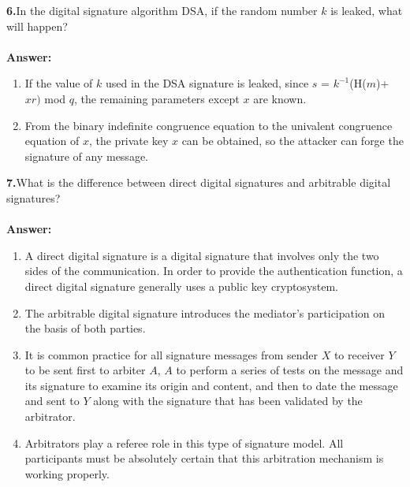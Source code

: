 \documentclass[paper=a4, fontsize=11pt]{scrartcl} %
\numberwithin{equation}{section} %
\numberwithin{figure}{section} %
\numberwithin{table}{section} %
\begin{document}
\textbf{6.}In the digital signature algorithm DSA, if the random number $k$ is leaked, what will happen?
\\
\\
\textbf{Answer:}
\begin{enumerate}
\item If the value of $k$ used in the DSA signature is leaked, since $s$ = $k^{-1}$(H($m$)+$xr)$ mod $q$, the remaining parameters except $x$ are known.
\item From the binary indefinite congruence equation to the univalent congruence equation of $x$, the private key $x$ can be obtained, so the attacker can forge the signature of any message.
\end{enumerate}

\textbf{7.}What is the difference between direct digital signatures and arbitrable digital signatures?
\\
\\
\textbf{Answer:}
\begin{enumerate}
\item A direct digital signature is a digital signature that involves only the two sides of the communication. In order to provide the authentication function, a direct digital signature generally uses a public key
    cryptosystem.
\item The arbitrable digital signature introduces the mediator's participation on the basis of both parties.
\item It is common practice for all signature messages from sender $X$ to receiver $Y$ to be sent first to arbiter $A$, $A$ to perform a series of tests on the message and its signature to examine its origin and content, and then to date the message and sent to $Y$ along with the signature that has been validated by the arbitrator.
\item Arbitrators play a referee role in this type of signature model. All participants must be absolutely certain that this arbitration mechanism is working properly.
\end{enumerate}
\end{document}
